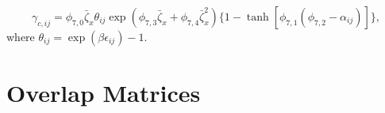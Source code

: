 \documentclass[
	12pt,				%
	openany,			%
	oneside,			%
	a4paper,			%
	english,			%
	brazil				%
	]{abntex2}
\begin{document}
\begin{apendicesenv}
\begin{equation}
\gamma_{c,ij} = \phi_{7,0} \bar{\zeta}_{x} \theta_{ij} \exp(\phi_{7,3} \bar{\zeta}_{x} + \phi_{7,4} \bar{\zeta}_{x}^2) \lbrace 1-\tanh [\phi_{7,1}(\phi_{7,2} - \alpha _{ij})] \rbrace,
\end{equation}
where $\theta _{ij} = \exp (\beta \epsilon_{ij}) -1$.

\chapter{Overlap Matrices}\label{overlapmatrix}

\begin{figure}

\end{figure}
\end{apendicesenv}
\end{document}
